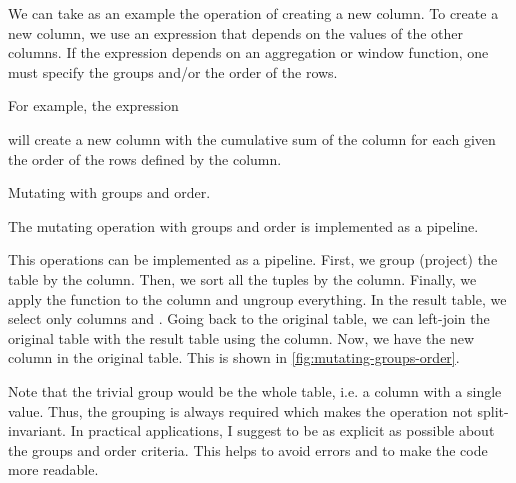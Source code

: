 We can take as an example the operation of creating a new column.  To create a new column,
we use an expression that depends on the values of the other columns.  If the expression
depends on an aggregation or window function, one must specify the groups and/or the order
of the rows.

For example, the expression
\begin{center}
\end{center}
will create a new column  with the cumulative sum of the  column for each
 given the order of the rows defined by the  column.

\begin{figurebox}[label=fig:mutating-groups-order]{Mutating with groups and order.}
  \centering
  \tcblower
  The mutating operation with groups and order is implemented as a pipeline.
\end{figurebox}

This operations can be implemented as a pipeline.  First, we group (project) the table by
the  column.  Then, we sort all the tuples by the  column. Finally,
we apply the  function to the  column and ungroup everything.  In the
result table, we select only columns  and .  Going back to the
original table, we can left-join the original table with the result table using the
 column.  Now, we have the new column  in the original table.
This is shown in \cref{fig:mutating-groups-order}.

Note that the trivial group would be the whole table, i.e. a column with a single value.
Thus, the grouping is always required which makes the operation not split-invariant.
In practical applications, I suggest to be as explicit as possible about the groups and
order criteria.  This helps to avoid errors and to make the code more readable.


